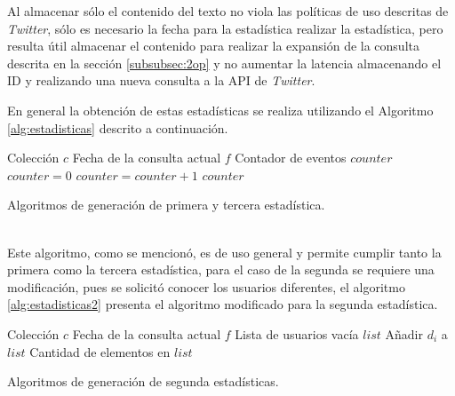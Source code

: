 Al almacenar sólo el contenido del texto no viola las políticas de uso descritas de \textit{Twitter}, sólo es necesario la fecha para la estadística realizar la estadística, pero resulta útil almacenar el contenido para realizar la expansión de la consulta descrita en la sección \ref{subsubsec:2op} y no aumentar la latencia almacenando el ID y realizando una nueva consulta a la API de \textit{Twitter}.

En general la obtención de estas estadísticas se realiza utilizando el Algoritmo \ref{alg:estadisticas} descrito a continuación.\\

\begin{algorithm}[H]
	\begin{algorithmic}
		\REQUIRE Colección $c$ 
		\REQUIRE Fecha de la consulta actual $f$ 
		\ENSURE Contador de eventos $counter$  
		\STATE $counter = 0$
				\STATE $counter = counter + 1$
			\ENDIF	
		\ENDFOR
		\RETURN $counter$
	\end{algorithmic}
	\caption{Algoritmos de generación de primera y tercera estadística.}
	\label{alg:estadisticas}
\end{algorithm}\vphantom\\

Este algoritmo, como se mencionó, es de uso general y permite cumplir tanto la primera como la tercera estadística, para el caso de la segunda se requiere una modificación, pues se solicitó conocer los usuarios diferentes, el algoritmo \ref{alg:estadisticas2} presenta el algoritmo modificado para la segunda estadística.\\

\begin{algorithm}[H]
	\begin{algorithmic}
		\REQUIRE Colección $c$ 
		\REQUIRE Fecha de la consulta actual $f$ 
		\ENSURE Lista de usuarios vacía $list$  
					\STATE Añadir $d_{i}$ a $list$
				\ENDIF
			\ENDIF	
		\ENDFOR
		\RETURN Cantidad de elementos en $list$
	\end{algorithmic}
	\caption{Algoritmos de generación de segunda estadísticas.}
	\label{alg:estadisticas2}
\end{algorithm}\vphantom\\

